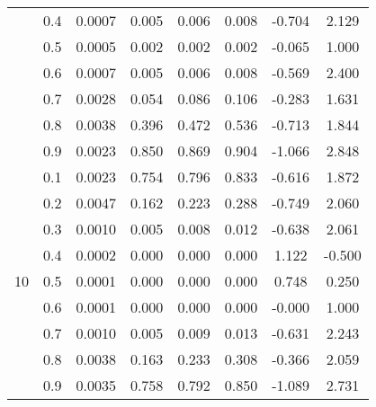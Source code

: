 \documentclass[11pt,a4paper]{report}
\begin{document}
\begin{longtable}{ | c | c || c | c | c | c | c | c | }
 & 0.4 & 0.0007 & 0.005 & 0.006 & 0.008 & -0.704 & 2.129 \\
 & 0.5 & 0.0005 & 0.002 & 0.002 & 0.002 & -0.065 & 1.000 \\
 & 0.6 & 0.0007 & 0.005 & 0.006 & 0.008 & -0.569 & 2.400 \\
 & 0.7 & 0.0028 & 0.054 & 0.086 & 0.106 & -0.283 & 1.631 \\
 & 0.8 & 0.0038 & 0.396 & 0.472 & 0.536 & -0.713 & 1.844 \\
 & 0.9 & 0.0023 & 0.850 & 0.869 & 0.904 & -1.066 & 2.848 \\
 \hline
\multirow{9}{*}{10} & 0.1 & 0.0023 & 0.754 & 0.796 & 0.833 & -0.616 & 1.872 \\
 & 0.2 & 0.0047 & 0.162 & 0.223 & 0.288 & -0.749 & 2.060 \\
 & 0.3 & 0.0010 & 0.005 & 0.008 & 0.012 & -0.638 & 2.061 \\
 & 0.4 & 0.0002 & 0.000 & 0.000 & 0.000 & 1.122 & -0.500 \\
 & 0.5 & 0.0001 & 0.000 & 0.000 & 0.000 & 0.748 & 0.250 \\
 & 0.6 & 0.0001 & 0.000 & 0.000 & 0.000 & -0.000 & 1.000 \\
 & 0.7 & 0.0010 & 0.005 & 0.009 & 0.013 & -0.631 & 2.243 \\
 & 0.8 & 0.0038 & 0.163 & 0.233 & 0.308 & -0.366 & 2.059 \\
 & 0.9 & 0.0035 & 0.758 & 0.792 & 0.850 & -1.089 & 2.731 \\
 \hline
\hline
\end{longtable}
\end{document}
